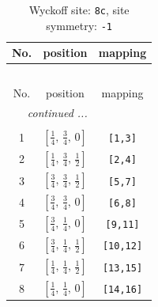 \documentclass[fleqn,8pt]{jsarticle}
\begin{document}
\renewcommand{\arraystretch}{1.2}
\begin{longtable}{ccc}
\caption{Wyckoff site: {\tt 8c}, site symmetry: {\tt -1}}
 \\
 \hline \hline
No. & position & mapping \\ \hline \endfirsthead

\multicolumn{2}{l}{\tablename\ \thetable{}} \\
 \hline \hline
No. & position & mapping \\ \hline \endhead

 \hline \hline
\multicolumn{2}{r}{\footnotesize\it continued ...} \\ \endfoot

 \hline \hline
\multicolumn{2}{r}{} \\ \endlastfoot

1 & $\left[ \frac{1}{4},\, \frac{3}{4},\, 0 \right]$ & {\tt [1,3]} \\ \hline
2 & $\left[ \frac{1}{4},\, \frac{3}{4},\, \frac{1}{2} \right]$ & {\tt [2,4]} \\ \hline
3 & $\left[ \frac{3}{4},\, \frac{3}{4},\, \frac{1}{2} \right]$ & {\tt [5,7]} \\ \hline
4 & $\left[ \frac{3}{4},\, \frac{3}{4},\, 0 \right]$ & {\tt [6,8]} \\ \hline
5 & $\left[ \frac{3}{4},\, \frac{1}{4},\, 0 \right]$ & {\tt [9,11]} \\ \hline
6 & $\left[ \frac{3}{4},\, \frac{1}{4},\, \frac{1}{2} \right]$ & {\tt [10,12]} \\ \hline
7 & $\left[ \frac{1}{4},\, \frac{1}{4},\, \frac{1}{2} \right]$ & {\tt [13,15]} \\ \hline
8 & $\left[ \frac{1}{4},\, \frac{1}{4},\, 0 \right]$ & {\tt [14,16]} \\
\end{longtable}
\renewcommand{\arraystretch}{1.2}
\end{document}
